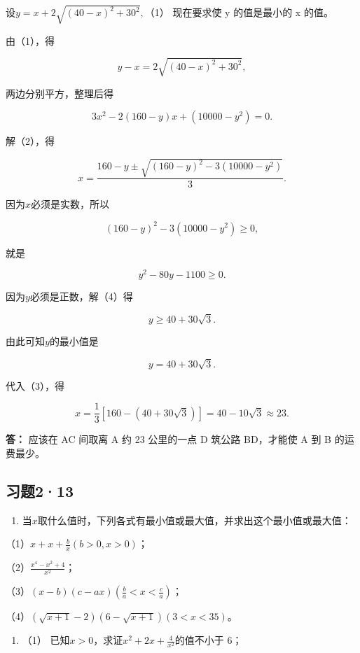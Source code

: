 设\(y = x + 2\sqrt{(40 - x)^2 + 30^2},\)（1） 现在要求使 y 的值是最小的
x 的值。

由（1），得

\[
y - x = 2 \sqrt{(40 - x)^{2} + 30^{2}},
\]

两边分别平方，整理后得

\[
3 x^{2} - 2 (160 - y) x + (10000 - y^{2}) = 0. \tag {2}
\]

解（2），得

\[
x = \frac{160 - y \pm \sqrt{(160 - y)^{2} - 3 (10000 - y^{2})}}{3}. \tag {3}
\]

因为\(x\)必须是实数，所以

\[
(160 - y)^{2} - 3 (10000 - y^{2}) \geqslant 0,
\]

就是

\[
y^{2} - 80 y - 1100 \geqslant 0. \tag {4}
\]

因为\(y\)必须是正数，解（4）得

\[
y\geqslant40+30\sqrt3.
\]

由此可知\(y\)的最小值是

\[
y = 40 + 30 \sqrt{3}.
\]

代入（3），得

\[
x = \frac{1}{3} [ 160 - (40 + 30 \sqrt{3}) ] = 40 - 10 \sqrt{3} \approx 23.
\]

\textbf{答：} 应该在 AC 间取离 A 约 23 公里的一点 D 筑公路 BD，才能使 A
到 B 的运费最少。

\subsection{习题2·13}

\begin{enumerate}
\item
  当\(x\)取什么值时，下列各式有最小值或最大值，并求出这个最小值或最大值：
\end{enumerate}

（1）\(x + x + \frac{b}{x}\)\((b > 0, x > 0)\)；

（2）\(\frac{x^4 - x^2 + 4}{x^2}\)；

（3）\((x - b)(c - ax)\left(\frac{b}{a} < x < \frac{c}{a}\right)\)；

（4）\((\sqrt{x + 1} - 2)(6 - \sqrt{x + 1})(3 < x < 35)\)。

\begin{enumerate}[start=2]
\item
  （1） 已知\(x > 0\)，求证\(x^2 + 2x + \frac{4}{x^2}\)的值不小于 6；
\end{enumerate}

